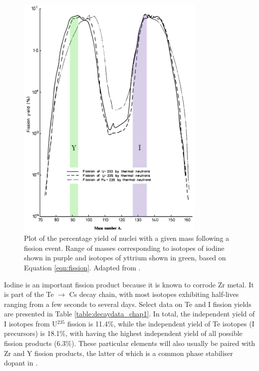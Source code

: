 \begin{figure}[ht!]
\centering
\includegraphics[height=12cm]{images/fissionyield.jpg}
\caption[Plot of the percentage yield of nuclei with a given mass following a fission event. Range of masses corresponding to isotopes of iodine shown in purple and isotopes of yttrium shown in green, based on Equation \ref{eqn:fission}.]{Plot of the percentage yield of nuclei with a given mass following a fission event. Range of masses corresponding to isotopes of iodine shown in purple and isotopes of yttrium shown in green, based on Equation \ref{eqn:fission}. Adapted from \cite{England1992}.}
\label{figure:fissionyield}
\end{figure}

Iodine is an important fission product because it is known to corrode Zr metal. It is part of the Te $\rightarrow$ Cs decay chain, with most isotopes exhibiting half-lives ranging from a few seconds to several days. Select data on Te and I fission yields are presented in Table \ref{table:decaydata_chap1}. In total, the independent yield of I isotopes from U$^{235}$ fission is 11.4\%, while the independent yield of Te isotopes (I precursors) is 18.1\%, with  having the highest independent yield of all possible fission products (6.3\%). These particular elements will also usually be paired with Zr and Y fission products, the latter of which is a common phase stabiliser dopant in \zirconia .


